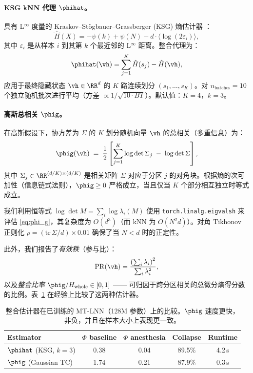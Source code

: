 \paragraph{KSG kNN 代理 $\phihat$。}
具有 L$^\infty$ 度量的 Kraskov--St\"ogbauer--Grassberger (KSG) 熵估计器 \citep{kraskov2004estimating}：
\begin{equation}
  \hat{H}(X) = -\psi(k) + \psi(N) + d\cdot\langle\log(2\varepsilon_i)\rangle,
\end{equation}
其中 $\varepsilon_i$ 是从样本 $i$ 到其第 $k$ 个最近邻的 L$^\infty$ 距离。整合代理为：
\begin{equation}
  \phihat(\vh) = \sum_{j=1}^{K}\hat{H}(s_j) - \hat{H}(\vh),
  \label{eq:phi_hat}
\end{equation}
应用于最终隐藏状态 $\vh\in\RR^d$ 的 $K$ 路连续划分 $(s_1,\ldots,s_K)$。对 $n_\text{batches}=10$ 个独立随机批次进行平均（方差 $\propto 1/\sqrt{10\cdot BT}$）。默认值：$K=4$，$k=3$。

\paragraph{高斯总相关 $\phig$。}
在高斯假设下，协方差为 $\Sigma$ 的 $K$ 划分随机向量 $\vh$ 的总相关（多重信息）为：
\begin{equation}
  \phig(\vh) \;=\; \frac{1}{2}\left[\sum_{j=1}^{K}\log\det\Sigma_j \;-\; \log\det\Sigma\right],
  \label{eq:phi_g}
\end{equation}
其中 $\Sigma_j\in\RR^{(d/K)\times(d/K)}$ 是相关矩阵 $\Sigma$ 对应于分区 $j$ 的对角块。根据熵的次可加性（信息链式法则），$\phig \ge 0$ 严格成立，当且仅当 $K$ 个部分相互独立时等式成立。

我们利用恒等式 $\log\det M = \sum_i\log\lambda_i(M)$ 使用 \texttt{torch.linalg.eigvalsh} 来评估 \eqref{eq:phi_g}，其复杂度为 $O(d^3)$（而 kNN 为 $O(N^2 d)$）。对角 Tikhonov 正则化 $\rho = (\mathrm{tr}\,\Sigma / d)\times 0.01$ 确保了当 $N < d$ 时的正定性。

此外，我们报告了\emph{有效秩}（参与比）：
\begin{equation}
  \mathrm{PR}(\vh) = \frac{\left(\sum_i\lambda_i\right)^2}{\sum_i\lambda_i^2},
  \label{eq:pr}
\end{equation}
以及\emph{整合比率} $\phig / H_\text{whole} \in [0,1]$ —— 可归因于跨分区相关的总微分熵得分数的比例。表~\ref{tab:phi_compare} 在经验上比较了这两种估计器。

\begin{table}[h]
\centering
\caption{整合估计器在已训练的 MT-LNN（128M 参数）上的比较。$\phig$ 速度更快，非负，并且在样本大小上表现更一致。}
\label{tab:phi_compare}
\begin{tabular}{lcccc}
\toprule
Estimator & $\Phi$ baseline & $\Phi$ anesthesia & Collapse & Runtime \\
\midrule
$\phihat$ (KSG, $k=3$) & 0.38 & 0.04 & 89.5\% & 4.2\,s \\
$\phig$ (Gaussian TC) & 1.74 & 0.21 & 87.9\% & 0.3\,s \\
\bottomrule
\end{tabular}
\end{table}

